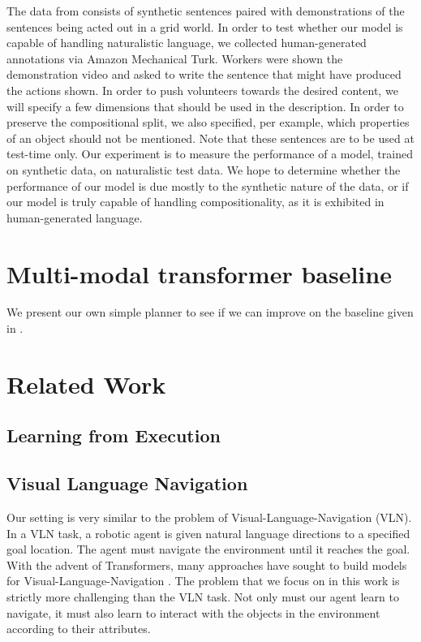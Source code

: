 \documentclass[11pt]{article}
\begin{document}
The data from \citet{ruis2020benchmark} consists of synthetic sentences paired with demonstrations of the sentences being acted out in a grid world.
%
In order to test whether our model is capable of handling naturalistic language, we collected human-generated annotations via Amazon Mechanical Turk.
%
Workers were shown the demonstration video and asked to write the sentence that might have produced the actions shown.
%
In order to push volunteers towards the desired content, we will specify a few dimensions that should be used in the description.
%
In order to preserve the compositional split, we also specified, per example, which properties of an object should not be mentioned.
%
Note that these sentences are to be used at test-time only.
%
Our experiment is to measure the performance of a model, trained on synthetic data, on naturalistic test data.
%
We hope to determine whether the performance of our model is due mostly to the synthetic nature of the data, or if our model is truly capable of handling compositionality, as it is exhibited in human-generated language. 

\section{Multi-modal transformer baseline}
\label{transformer-planner}
We present our own simple planner to see if we can improve on the baseline given in \cite{ruis2020benchmark}.

\section{Related Work}
\subsection{Learning from Execution}

\subsection{Visual Language Navigation}
Our setting is very similar to the problem of Visual-Language-Navigation (VLN). 
%
In a VLN task, a robotic agent is given natural language directions to a specified goal location. 
%
The agent must navigate the environment until it reaches the goal.
%
With the advent of Transformers, many approaches have sought to build models for Visual-Language-Navigation \citep{magassouba2021crossmap, fang2019scene, Chen2020TopologicalPW}.
%
The problem that we focus on in this work is strictly more challenging than the VLN task. 
%
Not only must our agent learn to navigate, it must also learn to interact with the objects in the environment according to their attributes.
\end{document}
